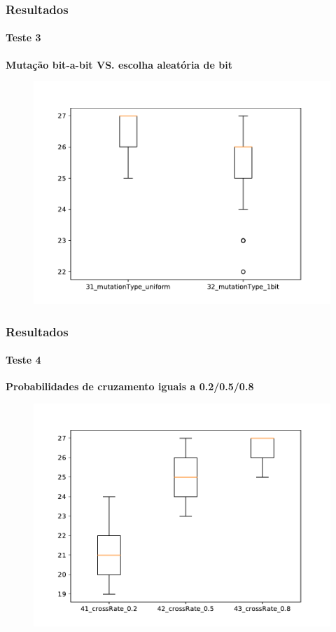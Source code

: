\documentclass{beamer}
\begin{document}
	\begin{frame}
		\frametitle{Resultados}
		\framesubtitle{Teste 3}
		\textbf{Mutação bit-a-bit VS. escolha aleatória de bit}
		\begin{figure}[H]
			\includegraphics[scale=0.5]{../relatorio/teste3.pdf}
		\end{figure}
	\end{frame}
	
	\begin{frame}
		\frametitle{Resultados}
		\framesubtitle{Teste 4}
		\textbf{Probabilidades de cruzamento iguais a 0.2/0.5/0.8}
		\begin{figure}[H]
			\includegraphics[scale=0.5]{../relatorio/teste4.pdf}
		\end{figure}
	\end{frame}
	
\end{document}
